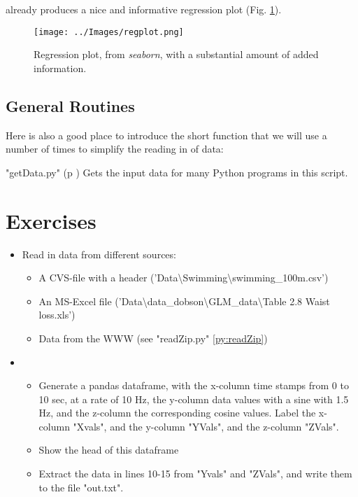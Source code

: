 already produces a nice and informative regression plot (Fig. \ref{fig:seaborn}).

\begin{figure}[ht]
  \centering
  \texttt{[image: ../Images/regplot.png]}\\
  \caption{Regression plot, from \emph{seaborn}, with a substantial amount of added information.}
  \label{fig:seaborn}
\end{figure}

\subsection{General Routines}
Here is also a good place to introduce the short function that we will use a number of times to simplify the reading in of data:

\PyImg "getData.py" (p \pageref{py:getData}) Gets the input data for many Python programs in this script.

\section{Exercises}

\begin{itemize}
  \item Read in data from different sources:
  \begin{itemize}
    \item A CVS-file with a header ('Data\textbackslash Swimming\textbackslash swimming\_100m.csv')
    \item An MS-Excel file ('Data\textbackslash data\_dobson\textbackslash GLM\_data\textbackslash Table 2.8 Waist loss.xls')
    \item Data from the WWW (see "readZip.py" \ref{py:readZip})
  \end{itemize}
  \item
  \begin{itemize}
      \item Generate a pandas dataframe, with the x-column time stamps from 0 to 10 sec, at a rate of 10 Hz, the y-column data values with a sine with 1.5 Hz, and the z-column the corresponding cosine values. Label the x-column "Xvals", and the y-column "YVals", and the z-column "ZVals".
      \item Show the head of this dataframe
      \item Extract the data in lines 10-15 from "Yvals" and "ZVals", and write them to the file "out.txt".
  \end{itemize}
\end{itemize}
